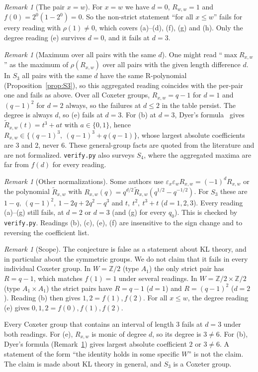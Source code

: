 \documentclass[11pt]{article}
\theoremstyle{remark}
\newtheorem{remark}[theorem]{Remark}
\begin{document}
\begin{remark}[The pair $x=w$]
For $x=w$ we have $d=0$, $R_{w,w}=1$ and $f(0)=2^0(1-2^0)=0$. So the non-strict
statement ``for all $x\le w$'' fails for every reading with $\rho(1)\ne0$, which
covers (a)--(d), (f), (g) and (h). Only the degree reading (e) survives $d=0$, and
it fails at $d=3$.
\end{remark}

\begin{remark}[Maximum over all pairs with the same $d$]\label{rem:agg}
One might read ``$\max R_{x,w}$'' as the maximum of $\rho(R_{x,w})$ over all pairs
with the given length difference $d$. In $S_3$ all pairs with the same $d$ have
the same R-polynomial (Proposition~\ref{prop:S3}), so this aggregated reading
coincides with the per-pair one and fails as above. Over all Coxeter groups,
$R_{x,w}=q-1$ for $d=1$ and $(q-1)^2$ for $d=2$ always, so the failures at
$d\le2$ in the table persist. The degree is always $d$, so (e) fails at $d=3$.
For (b) at $d=3$, Dyer's formula~\cite{dyer} gives
$\widetilde R_{x,w}(t)=t^3+at$ with $a\in\{0,1\}$, hence
$R_{x,w}\in\{(q-1)^3,\ (q-1)^3+q(q-1)\}$, whose largest absolute coefficients are
$3$ and $2$, never $6$. These general-group facts are quoted from the literature
and are not formalized. \texttt{verify.py} also surveys $S_4$, where the
aggregated maxima are far from $f(d)$ for every reading.
\end{remark}

\begin{remark}[Other normalizations]
Some authors use $\varepsilon_x\varepsilon_w R_{x,w}=(-1)^dR_{x,w}$ or the
polynomial $\widetilde R_{x,w}$ with
$R_{x,w}(q)=q^{d/2}\widetilde R_{x,w}(q^{1/2}-q^{-1/2})$. For $S_3$ these are
$1-q,\ (q-1)^2,\ 1-2q+2q^2-q^3$ and $t,\ t^2,\ t^3+t$ ($d=1,2,3$). Every reading
(a)--(g) still fails, at $d=2$ or $d=3$ (and (g) for every $q_0$). This is checked
by \texttt{verify.py}. Readings (b), (c), (e), (f) are insensitive to the sign
change and to reversing the coefficient list.
\end{remark}

\begin{remark}[Scope]
The conjecture is false as a statement about KL theory, and in particular about
the symmetric groups. We do not claim that it fails in every individual Coxeter
group. In $W=\mathbb Z/2$ (type $A_1$) the only strict pair has $R=q-1$, which
matches $f(1)=1$ under several readings. In $W=\mathbb Z/2\times\mathbb Z/2$
(type $A_1\times A_1$) the strict pairs have $R=q-1$ ($d=1$) and $R=(q-1)^2$
($d=2$). Reading (b) then gives $1,2=f(1),f(2)$. For all $x\le w$, the degree
reading (e) gives $0,1,2=f(0),f(1),f(2)$.

Every Coxeter group that contains an interval of length $3$ fails at $d=3$
under both readings. For (e), $R_{x,w}$ is monic of degree $d$, so its degree is
$3\ne6$. For (b), Dyer's formula (Remark~\ref{rem:agg}) gives largest absolute
coefficient $2$ or $3\ne6$. A statement of the form ``the identity holds in some
specific $W$'' is not the claim. The claim is made about KL theory in general,
and $S_3$ is a Coxeter group.
\end{remark}
\end{document}

